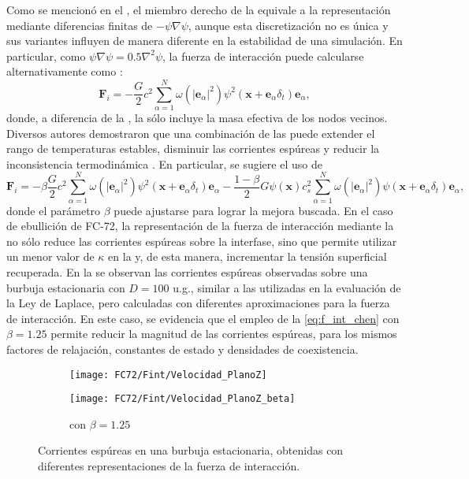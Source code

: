 Como se mencion\'o en el , el miembro derecho de la  equivale a la representaci\'on mediante diferencias finitas de $-\psi \nabla \psi$, aunque esta discretizaci\'on no es \'unica y sus variantes influyen de manera diferente en la estabilidad de una simulaci\'on. En particular, como $\psi \nabla \psi = 0.5 \nabla^2 \psi$, la fuerza de interacci\'on puede calcularse alternativamente como \cite{chen_critical_2014}:
\begin{equation}
	\bm{F}_i = -\dfrac{G}{2} c^2 \sum_{\alpha=1}^N \omega(|\bm{e}_{\alpha}|^2)\psi^2(\bm{x}+\bm{e}_{\alpha}\delta_t)\bm{e}_{\alpha},
	\label{eq:f_int_chen_0}
\end{equation}
donde, a diferencia de la , la  s\'olo incluye la masa efectiva de los nodos vecinos. Diversos autores demostraron que una combinaci\'on de las  puede extender el rango de temperaturas estables, disminuir las corrientes esp\'ureas y reducir la inconsistencia termodin\'amica \cite{kupershtokh_equations_2009, gong_numerical_2012}. En particular, se sugiere el uso de 
\begin{equation}
	\bm{F}_i = -\beta\dfrac{G}{2} c^2 \sum_{\alpha=1}^N \omega(|\bm{e}_{\alpha}|^2)\psi^2(\bm{x}+\bm{e}_{\alpha}\delta_t)\bm{e}_{\alpha}
	-\dfrac{1-\beta}{2} G\psi(\bm{x})c_s^2 \sum_{\alpha=1}^N \omega(|\bm{e}_{\alpha}|^2)\psi(\bm{x}+\bm{e}_{\alpha}\delta_t)\bm{e}_{\alpha},
	\label{eq:f_int_chen}
\end{equation}
donde el par\'ametro $\beta$ puede ajustarse para lograr la mejora buscada. En el caso de ebullici\'on de FC-72, la representaci\'on de la fuerza de interacci\'on mediante la  no s\'olo reduce las corrientes esp\'ureas sobre la interfase, sino que permite utilizar un menor valor de $\kappa$ en la  y, de esta manera, incrementar la tensi\'on superficial recuperada. En la  se observan las corrientes esp\'ureas observadas sobre una burbuja estacionaria con $D=100$ u.g., similar a las utilizadas en la evaluaci\'on de la Ley de Laplace, pero calculadas con diferentes aproximaciones para la fuerza de interacci\'on. En este caso, se evidencia que el empleo de la \eqref{eq:f_int_chen} con $\beta=1.25$ permite reducir la magnitud de las corrientes esp\'ureas, para los mismos factores de relajaci\'on, constantes de estado y densidades de coexistencia.

\begin{figure}[htb]
    \centering
    \begin{subfigure}[t]{0.45\textwidth}
        \centering
        \texttt{[image: FC72/Fint/Velocidad\_PlanoZ]}
        \caption{}
    \end{subfigure}
    \begin{subfigure}[t]{0.45\textwidth}
        \centering
        \texttt{[image: FC72/Fint/Velocidad\_PlanoZ\_beta]}
        \caption{ con $\beta=1.25$}
    \end{subfigure}    
    \caption{Corrientes esp\'ureas en una burbuja estacionaria, obtenidas con diferentes representaciones de la fuerza de interacci\'on.}
    \label{fig:fuerza_int}
\end{figure}

